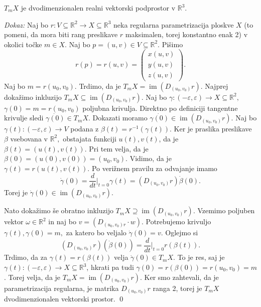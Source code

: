 \begin{trditev}
\label{trd_tangentna_ravnina_je_dvodimenzionalen_vektorski_prostor}
$T_mX$ je dvodimenzionalen realni vektorski podprostor v
$\mathbb{R}^3$. 
\end{trditev} 
{\em Dokaz:\/} Naj bo $r : V
\subseteq  \mathbb{R}^2 \to X \subseteq \mathbb{R}^3$ neka regularna
parametrizacija ploskve $X$ (to pomeni, da mora biti rang preslikave
$r$ maksimalen, torej konstantno enak 2) v okolici točke  $m \in  X$. Naj
bo $p = \left( u, v \right) \in  V \subseteq \mathbb{R}^2.$ Pišimo \begin{equation*} r\left(
p \right) = r\left( u,v \right) = 
\begin{pmatrix} x\left( u,v
\right) \\ y\left( u,v \right) \\ z\left( u,v \right)
\end{pmatrix} . \end{equation*}
Naj bo $m = r\left( u_0, v_0 \right).$ Trdimo, da
je $ T_mX = \operatorname{im} \left( D_{(u_0, v_0)}r \right) $.
Najprej dokažimo inkluzijo $T_mX \subseteq \operatorname{im} \left(
D_{(u_0, v_0)}r \right)$. 
Naj bo $\gamma: \left( -\varepsilon,
\varepsilon \right) \to X \subseteq \mathbb{R}^2,$ $\gamma \left( 0
\right) = m = r\left( u_0, v_0 \right)$ poljubna krivulja. Direktno
po definiciji tangentne krivulje sledi $\dot{\gamma\left( 0 \right)}
\in T_mX$. 
Dokazati moramo $\dot{\gamma(0)} \in \operatorname{im} \left(D_{\left( u_0, v_0 \right)} r \right)$. Naj bo
$\gamma\left( t \right) : \left( -\varepsilon, \varepsilon \right)\to
V$ podana z $\beta\left( t \right) = r^{-1}\left( \gamma\left( t
\right) \right)$. Ker je praslika preslikave $\beta$ vsebovana v
$\mathbb{R}^2,$ obstajata funkciji $u\left( t \right), v\left( t
\right)$, da je $\beta\left( t \right) = \left( u(t), v(t) \right).$
Pri tem velja, da je $\beta(0) = (u(0), v(0)) = (u_0, v_0).$ Vidimo,
da je $\gamma(t) = r(u(t), v(t)).$ Po verižnem pravilu za odvajanje
imamo \begin{equation*} \dot{\gamma }(0)= \frac{d}{dt} \big|_{t = 0} \gamma(t) =
\left( D_{ (u_0, v_0)}r \right) \dot{\beta} (0).\end{equation*}Torej je
$\dot{\gamma} (0) \in \operatorname{im} \left( D_{(u_0,v_0)}r
\right).$ 

Nato dokažimo še obratno inkluzijo $T_mX \supseteq
\operatorname{im} \left( D_{(u_0, v_0)}r \right)$. Vzemimo poljuben
vektor $\omega \in \mathbb{R}^2$ in naj bo $v = \left( D_{(u_0, v_0)r} \cdot w \right)$. Potrebujemo krivuljo $\gamma(t),
\gamma(0) = m,$ za katero bo veljalo $\dot{\gamma} (0) = v.$
Oglejmo si \begin{equation*} \left( D_{(u_0, v_0)}r \right)(\dot{\beta} (0)) =
\frac{d}{dt} \big|_{t = 0} r(\beta(t)). \end{equation*}  Trdimo, da za $\gamma(t) =
r(\beta(t))$  velja $\dot{\gamma}(0) \in  T_mX.$ To
je res, saj je $\gamma(t): (-\varepsilon,
\varepsilon)\to  X \subseteq \mathbb{R}^3$, hkrati pa tudi $\gamma(0) = r(\beta(0) )= r(u_0, v_0) = m$. Torej velja,
da je $T_mX = \operatorname{im}(D_{(u_0,v_0)}r)$. Ker smo zahtevali,
da je parametrizacija regularna, je matrika $D_{(u_0,v_0)}r$ ranga 2,
torej je  $T_mX$ dvodimenzionalen vektorski prostor.
\qed

